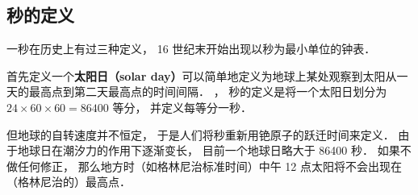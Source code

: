 
\subsection{秒的定义}
一秒在历史上有过三种定义， 16 世纪末开始出现以秒为最小单位的钟表． 

首先定义一个\textbf{太阳日（solar day）}可以简单地定义为地球上某处观察到太阳从一天的最高点到第二天最高点的时间间隔． ， 秒的定义是将一个太阳日划分为 $24\times60\times60 = 86400$ 等分， 并定义每等分一秒． 

但地球的自转速度并不恒定， 于是人们将秒重新用铯原子的跃迁时间来定义． 由于地球日在潮汐力的作用下逐渐变长， 目前一个地球日略大于 86400 秒． 如果不做任何修正， 那么地方时（如格林尼治标准时间）中午 12 点太阳将不会出现在（格林尼治的）最高点．
